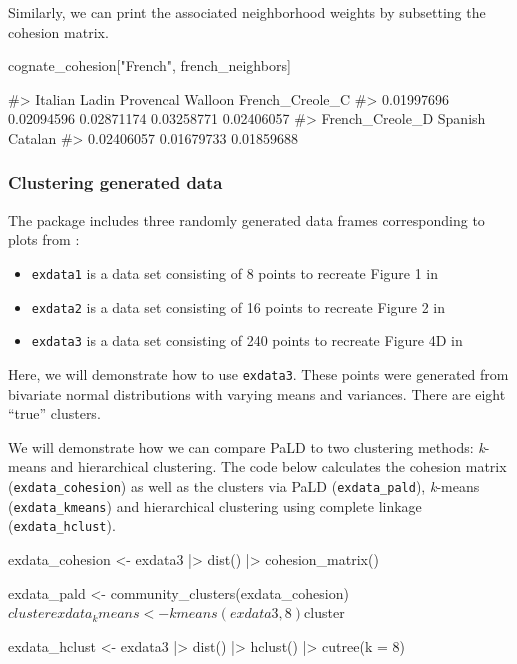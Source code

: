 Similarly, we can print the associated neighborhood weights by
subsetting the cohesion matrix.

\begin{Schunk}
\begin{Sinput}
cognate_cohesion["French", french_neighbors]
\end{Sinput}
\begin{Soutput}
#>         Italian           Ladin       Provencal         Walloon French_Creole_C 
#>      0.01997696      0.02094596      0.02871174      0.03258771      0.02406057 
#> French_Creole_D         Spanish         Catalan 
#>      0.02406057      0.01679733      0.01859688
\end{Soutput}
\end{Schunk}

\hypertarget{clustering-generated-data}{%
\subsubsection{Clustering generated
data}\label{clustering-generated-data}}

The  package includes three randomly generated data frames
corresponding to plots from \citet{berenhaut2022social}:

\begin{itemize}
\tightlist
\item
  \texttt{exdata1} is a data set consisting of 8 points to recreate
  Figure 1 in \citet{berenhaut2022social}
\item
  \texttt{exdata2} is a data set consisting of 16 points to recreate
  Figure 2 in \citet{berenhaut2022social}
\item
  \texttt{exdata3} is a data set consisting of 240 points to recreate
  Figure 4D in \citet{berenhaut2022social}
\end{itemize}

Here, we will demonstrate how to use \texttt{exdata3}. These points were
generated from bivariate normal distributions with varying means and
variances. There are eight ``true'' clusters.

We will demonstrate how we can compare PaLD to two clustering methods:
\emph{k}-means and hierarchical clustering. The code below calculates
the cohesion matrix (\texttt{exdata\_cohesion}) as well as the clusters
via PaLD (\texttt{exdata\_pald}), \emph{k}-means
(\texttt{exdata\_kmeans}) and hierarchical clustering using complete
linkage (\texttt{exdata\_hclust}).

\begin{Schunk}
\begin{Sinput}
exdata_cohesion <- exdata3 |>
  dist() |>
  cohesion_matrix()

exdata_pald <- community_clusters(exdata_cohesion)$cluster

exdata_kmeans <- kmeans(exdata3, 8)$cluster

exdata_hclust <- exdata3 |>
  dist() |>
  hclust() |>
  cutree(k = 8) 
\end{Sinput}
\end{Schunk}

